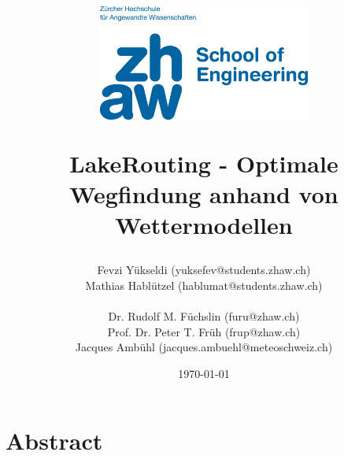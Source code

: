 \documentclass[a4paper,10pt]{article}
\begin{document}
 

\pagestyle{fancy} %
\fancyhf{} %
\renewcommand{\headrulewidth}{0.4pt} 
\fancyfoot[C]{\thepage}

\title{
 \begin{flushleft}
  \vspace*{-3cm}
  \includegraphics[keepaspectratio,width=7cm]{img/de-zhaw-cmyk}
 \end{flushleft}
 \vspace*{4cm}
 LakeRouting - Optimale Wegfindung anhand von Wettermodellen
}

\date{\today}
\author{Fevzi Yükseldi (yuksefev@students.zhaw.ch)\\
 Mathias Hablützel (hablumat@students.zhaw.ch)\\
 \\
 Dr. Rudolf M. Füchslin (furu@zhaw.ch)\\
 Prof. Dr. Peter T. Früh (frup@zhaw.ch)\\
 Jacques Ambühl (jacques.ambuehl@meteoschweiz.ch)
}
 
\maketitle

\thispagestyle{empty}
\newpage



\thispagestyle{empty}

\part*{Abstract}
\end{document}
